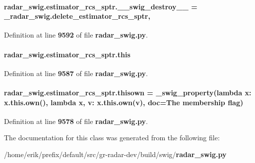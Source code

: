 \paragraph[{\+\_\+\+\_\+swig\+\_\+destroy\+\_\+\+\_\+}]{\setlength{\rightskip}{0pt plus 5cm}radar\+\_\+swig.\+estimator\+\_\+rcs\+\_\+sptr.\+\_\+\+\_\+swig\+\_\+destroy\+\_\+\+\_\+ = \+\_\+radar\+\_\+swig.\+delete\+\_\+estimator\+\_\+rcs\+\_\+sptr\hspace{0.3cm}{\ttfamily [static]}, {\ttfamily [private]}}\label{classradar__swig_1_1estimator__rcs__sptr_a948140a03040d8196dd154bf71cc3173}


Definition at line {\bf 9592} of file {\bf radar\+\_\+swig.\+py}.

\paragraph[{this}]{\setlength{\rightskip}{0pt plus 5cm}radar\+\_\+swig.\+estimator\+\_\+rcs\+\_\+sptr.\+this}\label{classradar__swig_1_1estimator__rcs__sptr_ae678a7e24989afb4f2ad498994f530b7}


Definition at line {\bf 9587} of file {\bf radar\+\_\+swig.\+py}.

\paragraph[{thisown}]{\setlength{\rightskip}{0pt plus 5cm}radar\+\_\+swig.\+estimator\+\_\+rcs\+\_\+sptr.\+thisown = {\bf \+\_\+swig\+\_\+property}(lambda x\+: x.\+this.\+own(), lambda {\bf x}, v\+: x.\+this.\+own(v), doc=\textquotesingle{}The membership flag\textquotesingle{})\hspace{0.3cm}{\ttfamily [static]}}\label{classradar__swig_1_1estimator__rcs__sptr_ad85c6271e04ef50897dd1c02895952cb}


Definition at line {\bf 9578} of file {\bf radar\+\_\+swig.\+py}.



The documentation for this class was generated from the following file\+:\begin{DoxyCompactItemize}
\item 
/home/erik/prefix/default/src/gr-\/radar-\/dev/build/swig/{\bf radar\+\_\+swig.\+py}\end{DoxyCompactItemize}
